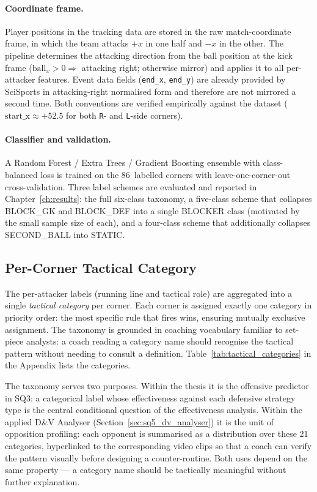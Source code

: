\paragraph{Coordinate frame.}
Player positions in the tracking data are stored in the raw match-coordinate
frame, in which the team attacks $+x$ in one half and $-x$ in the other. The
pipeline determines the attacking direction from the ball position at the
kick frame ($\mathrm{ball}_x > 0 \Rightarrow$ attacking right; otherwise mirror)
and applies it to all per-attacker features. Event data fields (\texttt{end\_x},
\texttt{end\_y}) are already provided by SciSports in attacking-right normalised
form and therefore are not mirrored a second time. Both conventions are
verified empirically against the dataset
($\mathrm{start\_x} \approx +52.5$ for both \texttt{R}- and \texttt{L}-side
corners).

\paragraph{Classifier and validation.}
A Random Forest / Extra Trees / Gradient Boosting ensemble with class-balanced
loss is trained on the 86~labelled corners with leave-one-corner-out
cross-validation. Three label schemes are evaluated and reported in
Chapter~\ref{ch:results}: the full six-class taxonomy, a five-class scheme that
collapses BLOCK\_GK and BLOCK\_DEF into a single BLOCKER class (motivated by
the small sample size of each), and a four-class scheme that additionally
collapses SECOND\_BALL into STATIC.

\subsection{Per-Corner Tactical Category}
\label{sec:sq2_taxonomy}

The per-attacker labels (running line and tactical role) are aggregated into a
single \emph{tactical category} per corner. Each corner is assigned exactly one
category in priority order: the most specific rule that fires wins, ensuring
mutually exclusive assignment. The taxonomy is grounded in coaching vocabulary
familiar to set-piece analysts: a coach reading a category name should
recognise the tactical pattern without needing to consult a definition.
Table~\ref{tab:tactical_categories} in the Appendix lists the categories.

The taxonomy serves two purposes. Within the thesis it is the offensive
predictor in SQ3: a categorical label whose effectiveness against each
defensive strategy type is the central conditional question of the
effectiveness analysis. Within the applied D\&V Analyser
(Section~\ref{sec:sq5_dv_analyser}) it is the unit of opposition profiling:
each opponent is summarised as a distribution over these 21 categories,
hyperlinked to the corresponding video clips so that a coach can verify the
pattern visually before designing a counter-routine. Both uses depend on the
same property — a category name should be tactically meaningful without
further explanation.

